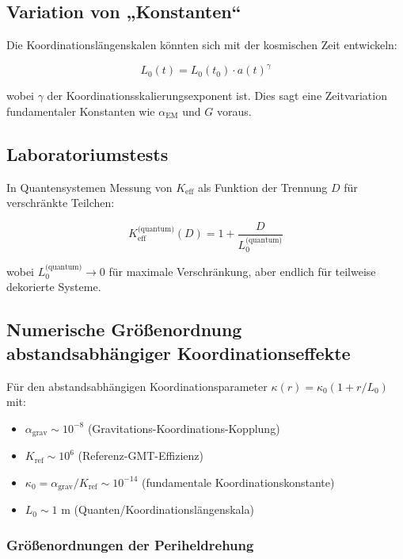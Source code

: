 \documentclass[11pt,a4paper]{article}
\begin{document}
	\subsection{Variation von „Konstanten“}
	
	Die Koordinationslängenskalen könnten sich mit der kosmischen Zeit entwickeln:
	
	\begin{equation}
		L_0(t) = L_0(t_0) \cdot a(t)^\gamma
	\end{equation}
	
	wobei $\gamma$ der Koordinationsskalierungsexponent ist. Dies sagt eine Zeitvariation fundamentaler Konstanten wie $\alpha_{\text{EM}}$ und $G$ voraus.
	
	\subsection{Laboratoriumstests}
	
	In Quantensystemen Messung von $K_{\mathrm{eff}}$ als Funktion der Trennung $D$ für verschränkte Teilchen:
	
	\begin{equation}
		K_{\mathrm{eff}}^{\text{(quantum)}}(D) = 1 + \frac{D}{L_0^{\text{(quantum)}}}
	\end{equation}
	
	wobei $L_0^{\text{(quantum)}} \to 0$ für maximale Verschränkung, aber endlich für teilweise dekorierte Systeme.
	
	\subsection{Numerische Größenordnung abstandsabhängiger Koordinationseffekte}
	\label{subsec:numerical-magnitudes}
	
	Für den abstandsabhängigen Koordinationsparameter $\kappa(r) = \kappa_0(1 + r/L_0)$ mit:
	\begin{itemize}
		\item $\alpha_{\text{grav}} \sim 10^{-8}$ (Gravitations-Koordinations-Kopplung)
		\item $K_{\text{ref}} \sim 10^6$ (Referenz-GMT-Effizienz)
		\item $\kappa_0 = \alpha_{\text{grav}}/K_{\text{ref}} \sim 10^{-14}$ (fundamentale Koordinationskonstante)
		\item $L_0 \sim 1$ m (Quanten/Koordinationslängenskala)
	\end{itemize}
	
	\subsubsection{Größenordnungen der Periheldrehung}
	
\end{document}
